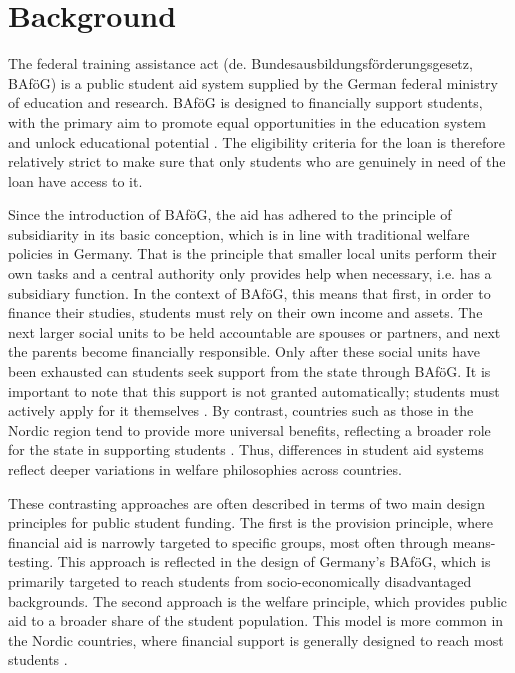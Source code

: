 \section{Background}

The federal training assistance act (de. Bundesausbildungsförderungsgesetz, BAföG) is a public student aid system supplied by the German federal ministry of education and research. BAföG is designed to financially support students, with the primary aim to promote equal opportunities in the education system and unlock educational potential \citep{meier_bafog_2024}. The eligibility criteria for the loan is therefore relatively strict to make sure that only students who are genuinely in need of the loan have access to it.

Since the introduction of BAföG, the aid has adhered to the principle of subsidiarity in its basic conception, which is in line with traditional welfare policies in Germany. 
That is the principle that smaller local units perform their own tasks and a central authority only provides help when necessary, i.e. has a subsidiary function. 
In the context of BAföG, this means that first, in order to finance their studies, students must rely on their own income and assets. 
The next larger social units to be held accountable are spouses or partners, and next the parents become financially responsible. 
Only after these social units have been exhausted can students seek support from the state through BAföG. 
It is important to note that this support is not granted automatically; students must actively apply for it themselves \citep{staack_von_2017}. 
By contrast, countries such as those in the Nordic region tend to provide more universal benefits, reflecting a broader role for the state in supporting students \citep{gwosc_krisenbewaltigung_2022, schwarz_study_2004}. 
Thus, differences in student aid systems reflect deeper variations in welfare philosophies across countries.

These contrasting approaches are often described in terms of two main design principles for public student funding. The first is the provision principle, where financial aid is narrowly targeted to specific groups, most often through means-testing. This approach is reflected in the design of Germany’s BAföG, which is primarily targeted to reach students from socio-economically disadvantaged backgrounds. The second approach is the welfare principle, which provides public aid to a broader share of the student population. This model is more common in the Nordic countries, where financial support is generally designed to reach most students \citep{gwosc_krisenbewaltigung_2022, oecd_education_2024}.

